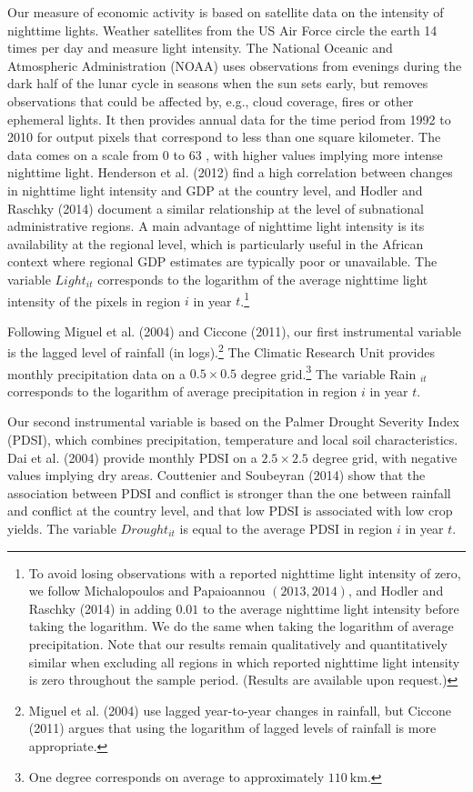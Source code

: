 \documentclass[10pt]{article}
\begin{document}
Our measure of economic activity is based on satellite data on the intensity of nighttime lights. 
Weather satellites from the US Air Force circle the earth 14 times per day and measure light intensity. 
The National Oceanic and Atmospheric Administration (NOAA) uses observations from evenings during the dark half of the lunar cycle in seasons when the sun sets early, but removes observations that could be affected by, e.g., cloud coverage, fires or other ephemeral lights.
It then provides annual data for the time period from 1992 to 2010 for output pixels that correspond to less than one square kilometer. 
The data comes on a scale from 0 to 63 , with higher values implying more intense nighttime light. 
Henderson et al. (2012) find a high correlation between changes in nighttime light intensity and GDP at the country level, and Hodler and Raschky (2014) document a similar relationship at the level of subnational administrative regions. 
A main advantage of nighttime light intensity is its availability at the regional level, which is particularly useful in the African context where regional GDP estimates are typically poor or unavailable. 
The variable  $Light_{i t}$ corresponds to the logarithm of the average nighttime light intensity of the pixels in region $i$ in year $t$.\footnote{To avoid losing observations with a reported nighttime light intensity of zero, we follow Michalopoulos and Papaioannou $(2013,2014)$, and Hodler and Raschky (2014) in adding $0.01$ to the average nighttime light intensity before taking the logarithm. We do the same when taking the logarithm of average precipitation. Note that our results remain qualitatively and quantitatively similar when excluding all regions in which reported nighttime light intensity is zero throughout the sample period. (Results are available upon request.)}

Following Miguel et al. (2004) and Ciccone (2011), our first instrumental variable is the lagged level of rainfall (in logs).\footnote{Miguel et al. (2004) use lagged year-to-year changes in rainfall, but Ciccone (2011) argues that using the logarithm of lagged levels of rainfall is more appropriate.}
The Climatic Research Unit provides monthly precipitation data on a $0.5 \times 0.5$ degree grid.\footnote{One degree corresponds on average to approximately $110 \mathrm{~km}$.}
The variable Rain $_{i t}$ corresponds to the logarithm of average precipitation in region $i$ in year $t$.

Our second instrumental variable is based on the Palmer Drought Severity Index (PDSI), which combines precipitation, temperature and local soil characteristics. 
Dai et al. (2004) provide monthly PDSI on a $2.5 \times 2.5$ degree grid, with negative values implying dry areas. 
Couttenier and Soubeyran (2014) show that the association between PDSI and conflict is stronger than the one between rainfall and conflict at the country level, and that low PDSI is associated with low crop yields. 
The variable  $Drought_{i t}$ is equal to the average PDSI in region $i$ in year $t$.
\end{document}
